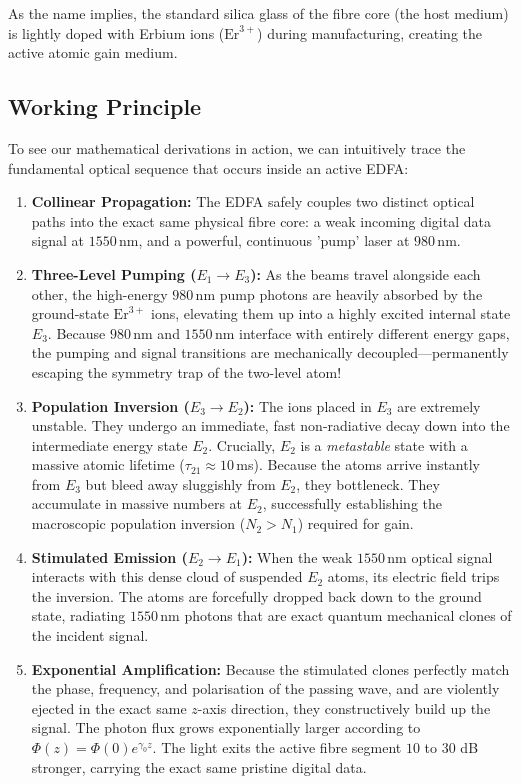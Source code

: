 As the name implies, the standard silica glass of the fibre core (the host medium) is lightly doped with Erbium ions ($\mathrm{Er}^{3+}$) during manufacturing, creating the active atomic gain medium.

\subsection{Working Principle}
To see our mathematical derivations in action, we can intuitively trace the fundamental optical sequence that occurs inside an active EDFA:

\begin{enumerate}
    \item \textbf{Collinear Propagation:} The EDFA safely couples two distinct optical paths into the exact same physical fibre core: a weak incoming digital data signal at $1550\,\text{nm}$, and a powerful, continuous 'pump' laser at $980\,\text{nm}$.

    \item \textbf{Three-Level Pumping ($E_1 \to E_3$):} As the beams travel alongside each other, the high-energy $980\,\text{nm}$ pump photons are heavily absorbed by the ground-state $\mathrm{Er}^{3+}$ ions, elevating them up into a highly excited internal state $E_3$. Because $980\,\text{nm}$ and $1550\,\text{nm}$ interface with entirely different energy gaps, the pumping and signal transitions are mechanically decoupled—permanently escaping the symmetry trap of the two-level atom!

    \item \textbf{Population Inversion ($E_3 \to E_2$):} The ions placed in $E_3$ are extremely unstable. They undergo an immediate, fast non-radiative decay down into the intermediate energy state $E_2$. Crucially, $E_2$ is a \emph{metastable} state with a massive atomic lifetime ($\tau_{21} \approx 10$\,ms). Because the atoms arrive instantly from $E_3$ but bleed away sluggishly from $E_2$, they bottleneck. They accumulate in massive numbers at $E_2$, successfully establishing the macroscopic population inversion ($N_2 > N_1$) required for gain.

    \item \textbf{Stimulated Emission ($E_2 \to E_1$):} When the weak $1550\,\text{nm}$ optical signal interacts with this dense cloud of suspended $E_2$ atoms, its electric field trips the inversion. The atoms are forcefully dropped back down to the ground state, radiating $1550\,\text{nm}$ photons that are exact quantum mechanical clones of the incident signal.

    \item \textbf{Exponential Amplification:} Because the stimulated clones perfectly match the phase, frequency, and polarisation of the passing wave, and are violently ejected in the exact same $z$-axis direction, they constructively build up the signal. The photon flux grows exponentially larger according to $\Phi(z) = \Phi(0)e^{\gamma_0 z}$. The light exits the active fibre segment $10$ to $30$ dB stronger, carrying the exact same pristine digital data.
\end{enumerate}

